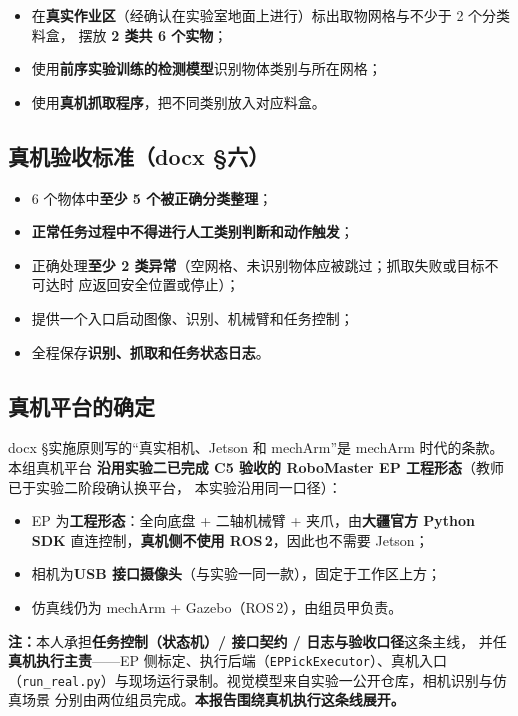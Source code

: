 \documentclass[12pt,a4paper]{ctexart}
\begin{document}
\begin{itemize}[leftmargin=1.6em]
  \item 在\textbf{真实作业区}（经确认在实验室地面上进行）标出取物网格与不少于 2 个分类料盒，
        摆放 \textbf{2 类共 6 个实物}；
  \item 使用\textbf{前序实验训练的检测模型}识别物体类别与所在网格；
  \item 使用\textbf{真机抓取程序}，把不同类别放入对应料盒。
\end{itemize}

\subsection*{真机验收标准（docx §六）}

\begin{itemize}[leftmargin=1.6em]
  \item 6 个物体中\textbf{至少 5 个被正确分类整理}；
  \item \textbf{正常任务过程中不得进行人工类别判断和动作触发}；
  \item 正确处理\textbf{至少 2 类异常}（空网格、未识别物体应被跳过；抓取失败或目标不可达时
        应返回安全位置或停止）；
  \item 提供一个入口启动图像、识别、机械臂和任务控制；
  \item 全程保存\textbf{识别、抓取和任务状态日志}。
\end{itemize}

\subsection*{真机平台的确定}

docx §实施原则写的“真实相机、Jetson 和 mechArm”是 mechArm 时代的条款。本组真机平台
\textbf{沿用实验二已完成 C5 验收的 RoboMaster EP 工程形态}（教师已于实验二阶段确认换平台，
本实验沿用同一口径）：

\begin{itemize}[leftmargin=1.6em]
  \item EP 为\textbf{工程形态}：全向底盘 + 二轴机械臂 + 夹爪，由\textbf{大疆官方 Python SDK}
        直连控制，\textbf{真机侧不使用 ROS\,2}，因此也不需要 Jetson；
  \item 相机为\textbf{USB 接口摄像头}（与实验一同一款），固定于工作区上方；
  \item 仿真线仍为 mechArm + Gazebo（ROS\,2），由组员甲负责。
\end{itemize}

\textbf{注：}本人承担\textbf{任务控制（状态机）/ 接口契约 / 日志与验收口径}这条主线，
并任\textbf{真机执行主责}——EP 侧标定、执行后端（\texttt{EPPickExecutor}）、真机入口
（\texttt{run\_real.py}）与现场运行录制。视觉模型来自实验一公开仓库，相机识别与仿真场景
分别由两位组员完成。\textbf{本报告围绕真机执行这条线展开。}
\end{document}
